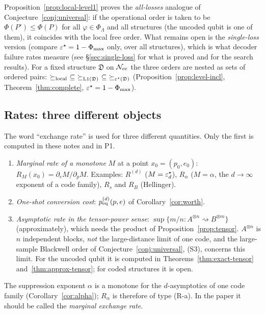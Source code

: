 \begin{remark}\label{rem:conj-reform}
Proposition~\ref{prop:local-level1} proves the \emph{all-losses} analogue of Conjecture~\ref{conj:universal}: if the operational order is taken to be $\Phi(P')\le\Phi(P)$ for all $\varphi\in\Phi_\Lambda$ and all structures (the uncoded qubit is one of them),
it coincides with the local free order. What remains open is the \emph{single-loss} version (compare $\varepsilon^{\star}=1-\Phi_{\max}$ only, over all structures), which is what decoder failure rates measure (see \S\ref{sec:single-loss} for what is proved and for the search results).
For a fixed structure $\mathfrak D$ on $\mathcal{N}_{\rm cc}$ the three orders are nested as sets of ordered pairs:
$\succeq_{\rm local}\ \subseteq\ \succeq_{\mathrm{L1}(\mathfrak D)}\ \subseteq\ \succeq_{\err(\mathfrak D)}$ (Proposition~\ref{prop:level-incl}, Theorem~\ref{thm:complete}, $\varepsilon^{\star}=1-\Phi_{\max}$).
\end{remark}

\subsection{Rates: three different objects}\label{sec:rates}

The word ``exchange rate'' is used for three different quantities. Only the first is computed in these notes and in P1.
\begin{enumerate}[(R-a)]
\item \emph{Marginal rate of a monotone} $M$ at a point $x_0=(p_0,e_0)$: $R_M(x_0)=\partial_eM/\partial_pM$. Examples: $R^{(d)}$ ($M=\varepsilon^{\star}_d$), $R_\alpha$ ($M=\alpha$, the $d\to\infty$ exponent of a code family), $R_s$ and $R_B$ (Hellinger).
\item \emph{One-shot conversion cost}: $p^{(d)}_{\rm eq}(p,e)$ of Corollary~\ref{cor:worth}.
\item \emph{Asymptotic rate in the tensor-power sense}: $\sup\{m/n: A^{\otimes n}\rightsquigarrow B^{\otimes m}\}$ (approximately), which needs the product of Proposition~\ref{prop:tensor}. $A^{\otimes n}$ is $n$ independent blocks, \emph{not} the large-distance limit of one code,
and the large-sample Blackwell order of Conjecture~\ref{conj:universal}, (S3), concerns this limit. For the uncoded qubit it is computed in Theorems~\ref{thm:exact-tensor} and~\ref{thm:approx-tensor}; for coded structures it is open.
\end{enumerate}
The suppression exponent $\alpha$ is a monotone for the $d$-asymptotics of one code family (Corollary~\ref{cor:alpha}); $R_\alpha$ is therefore of type (R-a). In the paper it should be called the \emph{marginal exchange rate}.

